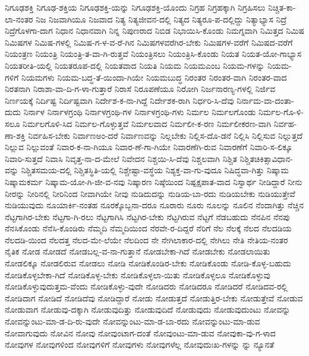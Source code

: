 {ನಿಗೂಢಶಕ್ತಿ
ನಿಗೂಢ-ಶಕ್ತಿಯ
ನಿಗೂಢಶಕ್ತಿ-ಯನ್ನು
ನಿಗೂಢಶಕ್ತಿ-ಯೊಂದು
ನಿಗ್ರಹ
ನಿಗ್ರಹಕ್ಕಾಗಿ
ನಿಗ್ರಹಿಸಲು
ನಿಚ್ಚಿತ-ಕಾ-ಲಾ-ನಂತರ
ನಿಜ
ನಿಜವಾಗಿಯೂ
ನಿಜವಾದ
ನಿತ್ಯ
ನಿತ್ಯಜೀವನ-ದಲ್ಲಿ
ನಿತ್ಯದ
ನಿತ್ಯರೂ-ಪ-ದಲ್ಲಿದ್ದು
ನಿತ್ಯಾಭ್ಯಾಸ
ನಿದ್ರೆ
ನಿದ್ರೆಗೊಳಗಾ-ದಾಗ
ನಿಧಾನ
ನಿಧಾನವಾಗಿ
ನಿನ್ನ
ನಿಪುಣರಾದ
ನಿಬಿಡ
ನಿಭಾಯಿಸಿ-ಕೊಂಡು
ನಿಮಗ್ನವಾಗಿ
ನಿಮಿತ್ತದ
ನಿಮಿಷ
ನಿಮಿಷಗಳ
ನಿಮಿಷ-ಗಳಲ್ಲಿ
ನಿಮಿಷ-ಗ-ಳ-ವ-ರೆ-ಗಿನ
ನಿಮಿಷಗಳವರೆಗಿರ-ಬೇಕು
ನಿಮಿಷಗಳ-ವರೆಗೆ
ನಿಮಿಷದ-ವರೆಗೆ
ನಿಯಂತ್ರಣ
ನಿಯಂತ್ರಿ
ನಿಯಂತ್ರಿ-ತ-ವಾ-ಗಿ-ರುತ್ತವೆ
ನಿಯಂತ್ರಿಸಲು
ನಿಯಂತ್ರಿಸಿ-ಕೊಂಡು
ನಿಯತ
ನಿಯತ-ಯೋ-ಗಾಭ್ಯಾಸ
ನಿಯತರೀತಿ-ಯಲ್ಲಿ
ನಿಯತರೂಪ-ದಲ್ಲಿ
ನಿಯತವಾದ
ನಿಯತಿ
ನಿಯಮ
ನಿಯಮಎಂಬ
ನಿಯಮ-ಗಳನ್ನು
ನಿಯಮ-ಗಳಿಗೆ
ನಿಯಮಗಳು
ನಿಯಮ-ಬದ್ಧ-ತೆ-ಯಿಂದಾ-ಗಿಯೇ
ನಿಯಮಬುದ್ಧ
ನಿರಂತರ
ನಿರಂತರ-ವಾಗಿ
ನಿರಂತರ-ವಾದ
ನಿರತನಾಗಿ
ನಿರಾಶಾ-ವಾ-ದಿ-ಗ-ಳಾ-ಗುತ್ತಾರೆ
ನಿರಾಸೆ
ನಿರೂಪಣೆಯೂ
ನಿರೋಗಿ
ನಿರ್ಜನಾರಣ್ಯ-ಗಳಲ್ಲಿ
ನಿರ್ಜಿವ
ನಿರ್ಣಯಕ್ಕೆ
ನಿರ್ದಿಷ್ಟ
ನಿರ್ದಿಷ್ಟವಾಗಿ
ನಿರ್ದೇಶ-ಕ-ನಾ-ಗಿದ್ದೆ
ನಿರ್ದೇಶಕ-ರಾಗಿ
ನಿರ್ಧರಿ-ಸಿ-ದೆವು
ನಿರ್ನಾಮ-ವಾ-ದಂತಾ-ದುದು
ನಿರ್ನಾಳ
ನಿರ್ನಾಳಗ್ರಂಥಿ
ನಿರ್ನಾಳಗ್ರಂಥಿ-ಗಳ
ನಿರ್ನಾಳಗ್ರಂಥಿ-ಗಳು
ನಿರ್ಮಲ
ನಿರ್ಮಲಗೊಂಡು
ನಿರ್ಮಲ-ಗೊ-ಳಿ-ಸಲೂ
ನಿರ್ಮಲಗೊಳಿ-ಸಿದ
ನಿರ್ಮಲ-ಗೊಳ್ಳುತ್ತವೆ
ನಿರ್ಮಲವಾದ
ನಿರ್ಮಲೀ-ಕ-ರಣ
ನಿರ್ಮಲೀಕರಣ-ವಾಗಿ
ನಿರ್ವಹ-ಣಾ-ಶಕ್ತಿ
ನಿರ್ವಹಿಸ-ಬೇಕು
ನಿರ್ವಾಣಅಂ-ದರೆ
ನಿರ್ವಾಣವನ್ನು
ನಿಲ್ಲಬೇಕು
ನಿಲ್ಲಿಸ-ದೊ-ಡನೆ
ನಿಲ್ಲಿಸಿ
ನಿಲ್ಲಿಸುವ
ನಿಲ್ಲುತ್ತದೆ
ನಿಲ್ಲುವ
ನಿಲ್ಲುವಂತೆ
ನಿವಾರ-ಕ-ನಾ-ಗಿಯೂ
ನಿವಾರ-ಣೆ-ಗಾ-ಗಿಯೇ
ನಿವಾರಣೆಗಿ-ರುವ
ನಿವಾರಣೆಗೆ
ನಿವಾರಿ-ಸ-ಲಿಕ್ಕೂ
ನಿವಾರಿ-ಸುತ್ತದೆ
ನಿವಾಸಿ
ನಿವೃತ್ತ-ನಾ-ದ-ಮೇಲೆ
ನಿವೇದನ
ನಿಶ್ಚಯಿ-ಸಿ-ದೆವು
ನಿಶ್ಚಲವಾಗಿ
ನಿಶ್ಚಿತ
ನಿಶ್ಚಿತಚಿಕಿತ್ಸಾವಿಧಾನ-ವನ್ನು
ನಿಶ್ಚಿತಸಮಯ-ದಲ್ಲಿ
ನಿಶ್ಚಿತಸ್ಥಿತಿ-ಯಲ್ಲಿ
ನಿಶ್ಚೇಷ್ಟಾ-ವಸ್ಥೆಯ
ನಿಶ್ಯಕ್ತ-ವಾ-ಗು-ವುದೂ
ನಿಷಿದ್ಧವಾ-ಗಿತ್ತು
ನಿಷ್ಕಾಮ
ನಿಷ್ಕಾಮಕರ್ಮ
ನಿಷ್ಕಾಮ-ಯೋ-ಗಿ-ಜೀ-ವ-ನವು
ನಿಷ್ಕಾರಣ
ನಿಷ್ಠೆಯಿಂದ
ನಿಷ್ಪಕ್ಷಪಾತ-ವಾದ
ನಿಸ್ವಾರ್ಥ
ನೀಡಿದ್ದಾರೆ
ನೀನು
ನೀರನ್ನು
ನೀರಿನಲ್ಲಿ
ನೀರಿನಿಂದ
ನೀವಾಗಿಯೇ
ನೀವು
ನುಡಿದುದನ್ನು
ನುಡಿಯ-ಬಾ-ರದು
ನುಡಿಯಬೇಕು
ನುಡಿಯುತ್ತೇವೆ
ನುಡಿಯುವುದು
ನೂಯಾರ್ಕಿ-ನಂತಹ
ನೂರಕ್ಕೊಬ್ಬನಾ-ದರೂ
ನೂರಾರು
ನೂರು
ನೂಲನ್ನು
ನೂಲಿನ
ನೆಂದಾಗಿತ್ತು
ನೆಚ್ಚಿನ
ನೆಟ್ಟಗಾಗಿರ-ಬೇಕು
ನೆಟ್ಟಗಾ-ಗಿ-ರಲು
ನೆಟ್ಟಗಾಗಿಸಿ
ನೆಟ್ಟಗಿರ-ಬೇಕು
ನೆಟ್ಟಗಿರುವ
ನೆಟ್ಟಗೆ
ನೆಡಬಹುದು
ನೆನಪಿನ
ನೆನಪು
ನೆನಸಿಕೊಂಡು
ನೆನೆಸಿ-ಕೊಂಡಿರು
ನೆಮ್ಮದಿ
ನೆಮ್ಮದಿಯಿಂದ
ನೆರವೇ-ರ-ದಿದ್ದರೆ
ನೆರಿಗೆ
ನೆಲ
ನೆಲಕ್ಕೆ
ನೆಲದ
ನೆಲದಡಿಯ
ನೆಲದಡಿ-ಯಿಂದ
ನೆಲದತ್ತ
ನೆಲದ-ಮೇ-ಲೆಯೇ
ನೆಲದಿಂದ
ನೇ
ನೇಗಿಲಾಕಾರ-ದಲ್ಲಿ
ನೇಗಿಲು
ನೇತಿ
ನೇತಿಯ-ನಂತರ
ನೈತಿಕ
ನೋಡ
ನೋಡದೆ
ನೋಡಬಲ್ಲ-ವ-ನಾ-ಗುತ್ತಾನೆ
ನೋಡಬೇಕಾ-ಗಿದೆ
ನೋಡಬೇಕು
ನೋಡಲಾಯಿತು
ನೋಡಲಿಕ್ಕೂ
ನೋಡಲಿರುವ
ನೋಡಲು
ನೋಡಿ
ನೋಡಿಕೊಂಡಿರ-ಬೇಕು
ನೋಡಿಕೊಂಡು
ನೋಡಿ-ಕೊಳ್ಳ-ಬಹುದು
ನೋಡಿಕೊಳ್ಳಬೇಕಾ-ಗಿದೆ
ನೋಡಿಕೊಳ್ಳ-ಬೇಕು
ನೋಡಿಕೊಳ್ಳಲಾ-ಯಿತು
ನೋಡಿಕೊಳ್ಳಲೂ
ನೋಡಿಕೊಳ್ಳುವು
ನೋಡಿಕೊಳ್ಳುವುದುತ್ತಮ-ವೆಂದು
ನೋಡಿಕೊಳ್ಳು-ವುದೇ
ನೋಡಿದರು
ನೋಡಿದರೂ
ನೋಡಿದರೆ
ನೋಡಿದವ-ರಲ್ಲಿ
ನೋಡಿದಾಗ
ನೋಡಿದೆ
ನೋಡಿದೆವು
ನೋಡಿದ್ದಾರೆ
ನೋಡು
ನೋಡುತ್ತದೆ
ನೋಡುತ್ತಿರ-ಬೇಕು
ನೋಡುತ್ತೇವೆ
ನೋಡುವ
ನೋಡುವಾಗ
ನೋಡುವು-ದಕ್ಕಾಗಿ
ನೋಡುವುದಿತ್ತು
ನೋಡುವುದಿದೆ
ನೋಡುವುದು
ನೋಡುವುದುಂಟು
ನೋವನ್ನು
ನೋವನ್ನುಂಟು-ಮಾ-ಡ-ದಿ-ರು-ವುದೇ
ನೋವನ್ನುಂಟು-ಮಾ-ಡ-ಬಾ-ರದು
ನೋವನ್ನುಂಟು-ಮಾ-ಡುವ
ನೋವಾಗುವುದು
ನೋವಿನ
ನೋವು
ನೋವುಂಟಾಗ-ದಂತೆ
ನೋವುಂಟು-ಮಾ-ಡುವ
ನೋವುಕಾ-ವು-ಗ-ಳಾದ
ನೋವುಗಳ
ನೋವುಗಳಿಂದ
ನೋವುಗಳಿಗೆ
ನೋವುಗಳು
ನೋವುಗಳೆಲ್ಲ
ನೋವುದುಃಖ-ಗಳನ್ನು
ನ್ನು
ನ್ಯೂನತೆ
}
